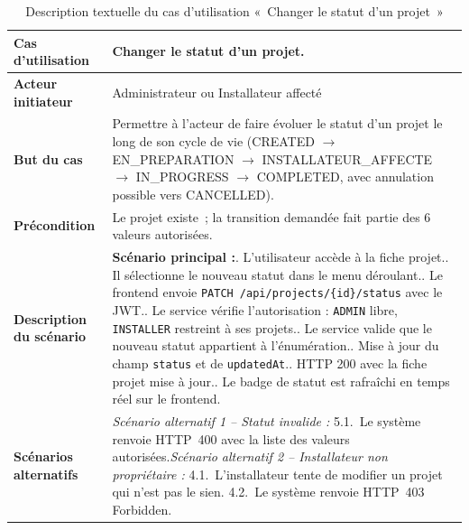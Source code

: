 \begin{table}[H]
  \caption{Description textuelle du cas d'utilisation «~Changer le statut d'un projet~»}
  \label{tab:cu-changer-statut}
  \centering
  \begin{tabularx}{\textwidth}{|L{3.8cm}|X|}
    \hline
    \textbf{Cas d'utilisation} & Changer le statut d'un projet. \\
    \hline
    \textbf{Acteur initiateur} & Administrateur ou Installateur affecté \\
    \hline
    \textbf{But du cas} & Permettre à l'acteur de faire évoluer le statut d'un projet le long de son cycle de vie (CREATED $\rightarrow$ EN\_PREPARATION $\rightarrow$ INSTALLATEUR\_AFFECTE $\rightarrow$ IN\_PROGRESS $\rightarrow$ COMPLETED, avec annulation possible vers CANCELLED). \\
    \hline
    \textbf{Précondition} & Le projet existe~; la transition demandée fait partie des 6 valeurs autorisées. \\
    \hline
    \textbf{Description du scénario} &
    \textbf{Scénario principal :}. L'utilisateur accède à la fiche projet.. Il sélectionne le nouveau statut dans le menu déroulant.. Le frontend envoie \texttt{PATCH /api/projects/\{id\}/status} avec le JWT.. Le service vérifie l'autorisation : \texttt{ADMIN} libre, \texttt{INSTALLER} restreint à ses projets.. Le service valide que le nouveau statut appartient à l'énumération.. Mise à jour du champ \texttt{status} et de \texttt{updatedAt}.. HTTP 200 avec la fiche projet mise à jour.. Le badge de statut est rafraîchi en temps réel sur le frontend.\\
    \hline
    \textbf{Scénarios alternatifs} &
    \textit{Scénario alternatif 1 -- Statut invalide :}\newline
    \hspace*{6pt}5.1.~Le système renvoie HTTP~400 avec la liste des valeurs autorisées.\newline[2pt]
    \textit{Scénario alternatif 2 -- Installateur non propriétaire :}\newline
    \hspace*{6pt}4.1.~L'installateur tente de modifier un projet qui n'est pas le sien.\newline
    \hspace*{6pt}4.2.~Le système renvoie HTTP~403 Forbidden.\\
    \hline
  \end{tabularx}
\end{table}

